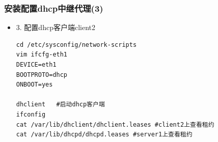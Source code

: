 \documentclass[xcolor=svgnames,presentation]{beamer}
\begin{document}
\begin{frame}[fragile]
\frametitle{安装配置dhcp中继代理(3)}
\label{sec-2-6}
\begin{itemize}

\item 3. 配置dhcp客户端client2\\
\label{sec-2-6-1}%
\begin{verbatim}
cd /etc/sysconfig/network-scripts
vim ifcfg-eth1
DEVICE=eth1
BOOTPROTO=dhcp
ONBOOT=yes

dhclient   #启动dhcp客户端
ifconfig
cat /var/lib/dhclient/dhclient.leases #client2上查看租约
cat /var/lib/dhcpd/dhcpd.leases #server1上查看租约
\end{verbatim}
\end{itemize} %
\end{frame}
\end{document}
